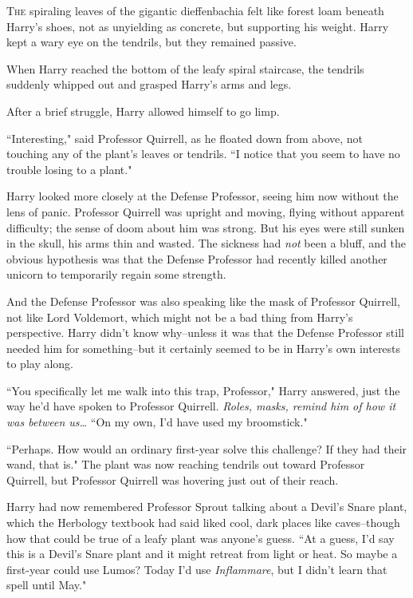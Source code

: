 
\lettrine{T}{he} spiraling leaves of the gigantic dieffenbachia felt like forest loam beneath Harry's shoes, not as unyielding as concrete, but supporting his weight. Harry kept a wary eye on the tendrils, but they remained passive.

When Harry reached the bottom of the leafy spiral staircase, the tendrils suddenly whipped out and grasped Harry's arms and legs.

After a brief struggle, Harry allowed himself to go limp.

``Interesting," said Professor Quirrell, as he floated down from above, not touching any of the plant's leaves or tendrils. ``I notice that you seem to have no trouble losing to a plant."

Harry looked more closely at the Defense Professor, seeing him now without the lens of panic. Professor Quirrell was upright and moving, flying without apparent difficulty; the sense of doom about him was strong. But his eyes were still sunken in the skull, his arms thin and wasted. The sickness had \emph{not} been a bluff, and the obvious hypothesis was that the Defense Professor had recently killed another unicorn to temporarily regain some strength.

And the Defense Professor was also speaking like the mask of Professor Quirrell, not like Lord Voldemort, which might not be a bad thing from Harry's perspective. Harry didn't know why\---unless it was that the Defense Professor still needed him for something\---but it certainly seemed to be in Harry's own interests to play along.

``You specifically let me walk into this trap, Professor," Harry answered, just the way he'd have spoken to Professor Quirrell. \emph{Roles, masks, remind him of how it was between us{\ldots}} ``On my own, I'd have used my broomstick."

``Perhaps. How would an ordinary first-year solve this challenge? If they had their wand, that is." The plant was now reaching tendrils out toward Professor Quirrell, but Professor Quirrell was hovering just out of their reach.

Harry had now remembered Professor Sprout talking about a Devil's Snare plant, which the Herbology textbook had said liked cool, dark places like caves\---though how that could be true of a leafy plant was anyone's guess. ``At a guess, I'd say this is a Devil's Snare plant and it might retreat from light or heat. So maybe a first-year could use Lumos? Today I'd use \emph{Inflammare}, but I didn't learn that spell until May."


